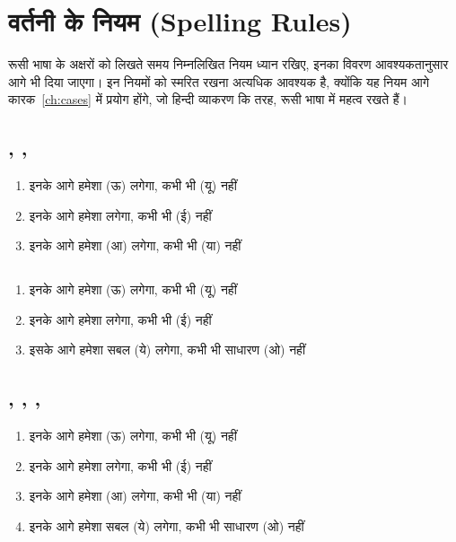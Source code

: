 \section{वर्तनी के नियम (Spelling Rules)~\cite{levine_2009, robin_2012}}\label{sec:alpha-spelling}
  रूसी भाषा के अक्षरों को लिखते समय निम्नलिखित नियम ध्यान रखिए, इनका विवरण आवश्यकतानुसार आगे भी दिया जाएगा। इन नियमों
  को स्मरित रखना अत्यधिक आवश्यक है, क्योंकि यह नियम आगे कारक~\ref{ch:cases} में प्रयोग होंगे, जो हिन्दी व्याकरण कि
  तरह, रूसी भाषा में महत्व रखते हैं।

  \subsection{, , }\label{subsec:alpha-spelling-k-g-h}
    \begin{enumerate}
      \item इनके आगे हमेशा  (ऊ) लगेगा, कभी भी  (यू) नहीं
      \item इनके आगे हमेशा  लगेगा, कभी भी  (ई) नहीं
      \item इनके आगे हमेशा  (आ) लगेगा, कभी भी  (या) नहीं
    \end{enumerate}

  \subsection{}\label{subsec:alpha-spelling-ts}
    \begin{enumerate}
      \item इनके आगे हमेशा  (ऊ) लगेगा, कभी भी  (यू) नहीं
      \item इनके आगे हमेशा  लगेगा, कभी भी  (ई) नहीं
      \item इसके आगे हमेशा सबल  (ये) लगेगा, कभी भी साधारण  (ओ) नहीं
    \end{enumerate}

  \subsection{, , , }\label{subsec:alpha-spelling-zh-ch-sh-scsh-ts}
    \begin{enumerate}
      \item इनके आगे हमेशा  (ऊ) लगेगा, कभी भी  (यू) नहीं
      \item इनके आगे हमेशा  लगेगा, कभी भी  (ई) नहीं
      \item इनके आगे हमेशा  (आ) लगेगा, कभी भी  (या) नहीं
      \item इनके आगे हमेशा सबल  (ये) लगेगा, कभी भी साधारण  (ओ) नहीं
    \end{enumerate}
